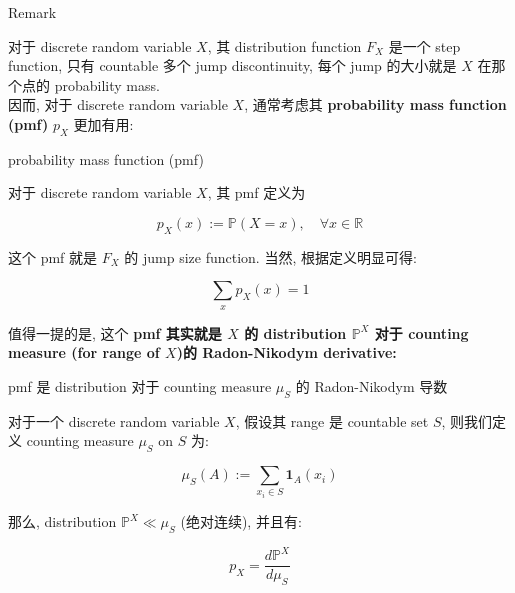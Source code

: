 \documentclass{qlnotes-export}
\begin{document}
\begin{qlremark}{Remark}

对于 discrete random variable \(X\), 其 distribution function \(F_{X}\) 是一个 step function, 只有 countable 多个 jump discontinuity, 每个 jump 的大小就是 \(X\) 在那个点的 probability mass.\\
因而, 对于 discrete random variable \(X\), 通常考虑其 \textbf{probability mass function (pmf)} \(p_{X}\) 更加有用:

\begin{definition}{probability mass function (pmf)}\label{def-02-random-variables-probability-mass-function-pmf}

对于 discrete random variable \(X\), 其 pmf 定义为

\[p_{X}(x) := {\mathbb{P}}(X = x),\quad\forall x \in {\mathbb{R}}\]

\end{definition}

这个 pmf 就是 \(F_{X}\) 的 jump size function. 当然, 根据定义明显可得:

\[\sum\limits_{x}p_{X}(x) = 1\]

\end{qlremark}

值得一提的是, 这个 \textbf{pmf 其实就是 \(X\) 的 distribution \({\mathbb{P}}^{X}\) 对于 counting measure (for range of \(X\))的 Radon-Nikodym derivative:}

\begin{proposition}{pmf 是 distribution 对于 counting measure \(\mu_{S}\) 的 Radon-Nikodym
导数}\label{prop-02-random-variables-pmf-distribution-counting-measure-mu-s-radon-nikodym}

对于一个 discrete random variable \(X\), 假设其 range 是 countable set \(S\), 则我们定义 counting measure \(\mu_{S}\) on \(S\) 为:

\[\mu_{S}(A) := \sum\limits_{x_{i} \in S}\mathbf{1}_{A}(x_{i})\]

那么, distribution \({\mathbb{P}}^{X} \ll \mu_{S}\) (绝对连续), 并且有:

\[p_{X} = \frac{d{\mathbb{P}}^{X}}{d\mu_{S}}\]

\end{proposition}
\end{document}
